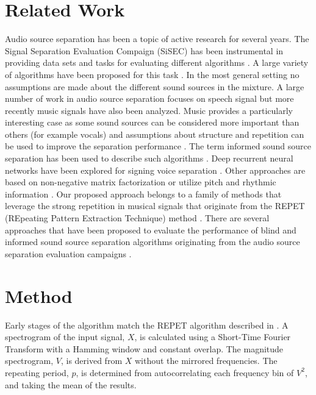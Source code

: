 \documentclass{article}
\begin{document}
\section{Related Work} 


Audio source separation has been a topic of active research for
several years. The Signal Separation Evaluation Compaign (SiSEC) has
been instrumental in providing data sets and tasks for evaluating
different algorithms \cite{sisec, Vincent:2012ab,stoter20182018}. A large variety of
algorithms have been proposed for this task \cite{bayes,
  Haddad:2008aa}. In the most general setting no assumptions are made
about the different sound sources in the mixture. A large number of
work in audio source separation focuses on speech signal
\cite{DNNSpeech, DNNSpech2} but more recently music signals have also
been analyzed. Music provides a particularly interesting case as some
sound sources can be considered more important than others (for
example vocals) and assumptions about structure and repetition 
can be used to improve the separation performance \cite{Dannenberg:2008aa}. 
The term informed sound source separation has been used to describe 
such algorithms \cite{liutkus:hal-00958661}. Deep recurrent neural networks have been
explored for signing voice separation \cite{DNNSing}. Other approaches
are based on non-negative matrix factorization \cite{fasst} or utilize
pitch and rhythmic information \cite{Rafii:2014aa}. Our proposed
approach belongs to a family of methods that leverage the strong
repetition in musical signals that originate from the REPET (REpeating
Pattern Extraction Technique) method \cite{separation, REPET, online,
  filtering}. There are several approaches that have been proposed to
evaluate the performance of blind and informed sound source separation
algorithms \cite{Vincent:2006aa, emiya:inria-00567152} originating
from the audio source separation evaluation campaigns \cite{BSS,
  Vincent:2012ab}.

\section{Method}

Early stages of the algorithm match the REPET algorithm described in \cite{separation}. A spectrogram of the input signal, $X$, is calculated using a Short-Time Fourier Transform with a Hamming window and constant overlap. The magnitude spectrogram, $V$, is derived from $X$ without the mirrored frequencies. The repeating period, $p$, is determined from autocorrelating each frequency bin of $V^2$, and taking the mean of the results. 
\end{document}
